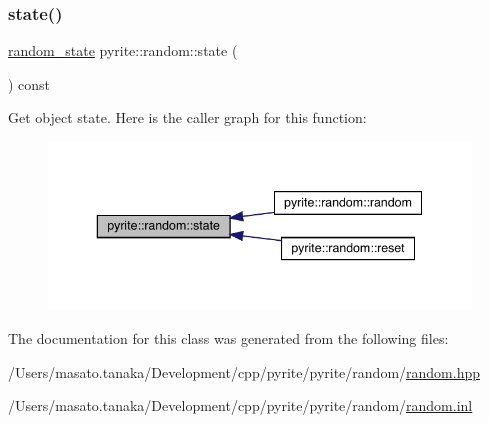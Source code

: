 \subsubsection{\texorpdfstring{state()}{state()}}
{\footnotesize\ttfamily \mbox{\hyperlink{structpyrite_1_1random__state}{random\+\_\+state}} pyrite\+::random\+::state (\begin{DoxyParamCaption}{ }\end{DoxyParamCaption}) const\hspace{0.3cm}{\ttfamily [noexcept]}}

Get object state. Here is the caller graph for this function\+:
\nopagebreak
\begin{figure}[H]
\begin{center}
\leavevmode
\includegraphics[width=343pt]{d2/df9/classpyrite_1_1random_a25c469022ddee73c6a4ecce2814d22d4_icgraph}
\end{center}
\end{figure}


The documentation for this class was generated from the following files\+:\begin{DoxyCompactItemize}
\item 
/\+Users/masato.\+tanaka/\+Development/cpp/pyrite/pyrite/random/\mbox{\hyperlink{random_2random_8hpp}{random.\+hpp}}\item 
/\+Users/masato.\+tanaka/\+Development/cpp/pyrite/pyrite/random/\mbox{\hyperlink{random_8inl}{random.\+inl}}\end{DoxyCompactItemize}
